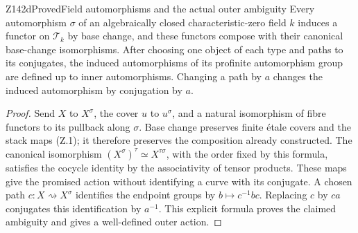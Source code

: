 \begin{result}{Z142d}{Proved}{Field automorphisms and the actual outer ambiguity}
Every automorphism $\sigma$ of an algebraically closed characteristic-zero
field $k$ induces a functor on $\mathcal T_k$ by base change, and these
functors compose with their canonical base-change isomorphisms. After
choosing one object of each type and paths to its conjugates, the
induced automorphisms of its profinite automorphism group are defined
up to inner automorphisms. Changing a path by $a$ changes the induced
automorphism by conjugation by $a$.
\end{result}
\begin{proof}
Send $X$ to $X^\sigma$, the cover $u$ to $u^\sigma$, and a natural
isomorphism of fibre functors to its pullback along $\sigma$.
Base change preserves finite \'etale covers and the stack maps (Z.1);
it therefore preserves the composition already constructed. The
canonical isomorphism $(X^\sigma)^\tau\simeq X^{\tau\sigma}$, with
the order fixed by this formula, satisfies the cocycle identity by
the associativity of tensor products. These maps give the promised
action without identifying a curve with its conjugate.
A chosen path $c:X\rightsquigarrow X^\sigma$ identifies the endpoint
groups by $b\mapsto c^{-1}b c$. Replacing $c$ by $ca$ conjugates this
identification by $a^{-1}$. This explicit formula proves the claimed
ambiguity and gives a well-defined outer action.
\end{proof}

